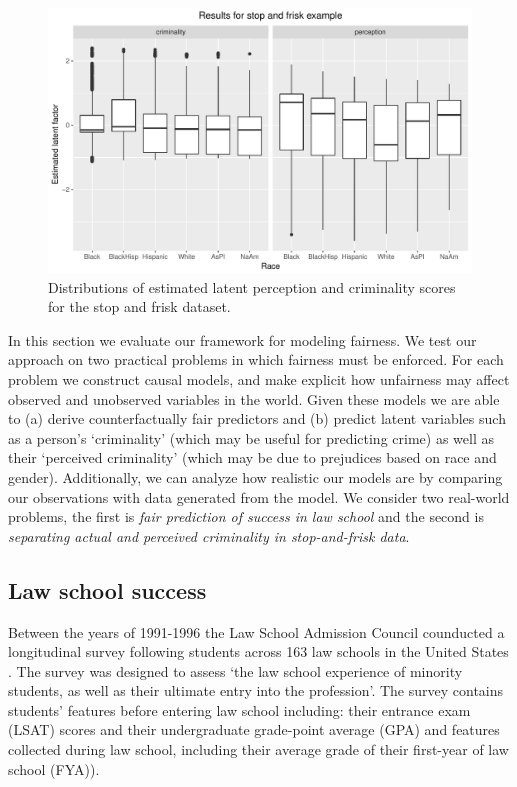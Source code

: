 \begin{figure}[!th]
\begin{center}
\vspace{-1ex}
\centerline{\includegraphics[width=\columnwidth]{stopandfrisk_output.pdf}}
\vspace{-2ex}
\caption{Distributions of estimated latent perception and criminality scores for the stop and frisk dataset.\label{figure.stop_and_frisk_output}}
\vspace{-2ex}
\end{center}
\end{figure}

In this section we evaluate our framework for modeling fairness. We test our approach on two practical problems in which fairness must be enforced. For each problem we construct causal models, and make explicit how unfairness may affect observed and unobserved variables in the world. Given these models we are able to (a) derive counterfactually fair predictors and (b) predict latent variables such as a person's `criminality' (which may be useful for predicting crime) as well as their `perceived criminality' (which may be due to prejudices based on race and gender). Additionally, we can analyze how realistic our models are by comparing our observations with data generated from the model. We consider two real-world problems, the first is \emph{fair prediction of success in law school} and the second is \emph{separating actual and perceived criminality in stop-and-frisk data}.

\subsection{Law school success}
Between the years of 1991-1996 the Law School Admission Council
counducted a longitudinal survey following students across 163 law
schools in the United States \cite{wightman1998lsac}. The survey was
designed to assess `the law school experience of minority students, as
well as their ultimate entry into the profession'. The survey contains
students' features before entering law school including: their
entrance exam (LSAT) scores and their undergraduate grade-point
average (GPA) and features collected during law school, including their average
grade of their first-year of law school (FYA)). %


